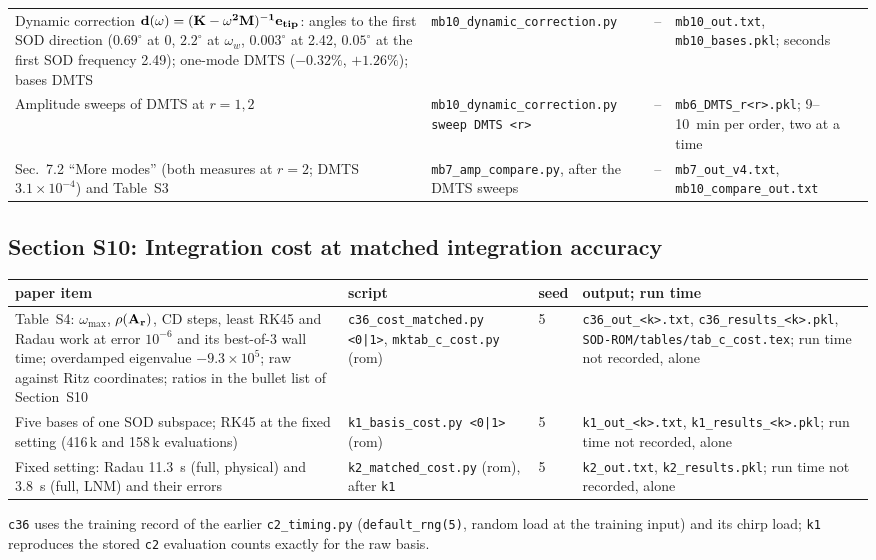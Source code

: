 \documentclass[10pt]{article}
\newcommand{\f}[1]{\texttt{#1}}
\begin{document}
\begin{longtable}{L{0.31\textwidth}L{0.25\textwidth}L{0.08\textwidth}L{0.25\textwidth}}
Dynamic correction $\bf d(\omega)=(K-\omega^2 M)^{-1}e_{tip}$: angles to the first SOD direction ($0.69^\circ$ at 0, $2.2^\circ$ at $\omega_w$, $0.003^\circ$ at 2.42, $0.05^\circ$ at the first SOD frequency 2.49); one-mode DMTS ($-0.32\%$, $+1.26\%$); bases DMTS & \f{mb10\_\allowbreak{}dynamic\_\allowbreak{}correction.py} & -- & \f{mb10\_\allowbreak{}out.txt}, \f{mb10\_\allowbreak{}bases.pkl}; seconds\\
Amplitude sweeps of DMTS at $r=1,2$ & \f{mb10\_\allowbreak{}dynamic\_\allowbreak{}correction.py sweep DMTS <r>} & -- & \f{mb6\_\allowbreak{}DMTS\_\allowbreak{}r<r>.pkl}; 9--10~min per order, two at a time\\
Sec.~7.2 ``More modes'' (both measures at $r=2$; DMTS $3.1\times10^{-4}$) and Table~S3 & \f{mb7\_\allowbreak{}amp\_\allowbreak{}compare.py}, after the DMTS sweeps & -- & \f{mb7\_\allowbreak{}out\_\allowbreak{}v4.txt}, \f{mb10\_\allowbreak{}compare\_\allowbreak{}out.txt}\\
\bottomrule
\end{longtable}

\subsection*{Section S10: Integration cost at matched integration accuracy}
\begin{longtable}{L{0.31\textwidth}L{0.25\textwidth}L{0.08\textwidth}L{0.25\textwidth}}
\toprule
paper item & script & seed & output; run time\\ \midrule
Table~S4: $\omega_{\max}$, $\rho(\bf A_r)$, CD steps, least RK45 and Radau work at error $10^{-6}$ and its best-of-3 wall time; overdamped eigenvalue $-9.3\times10^5$; raw against Ritz coordinates; ratios in the bullet list of Section~S10 & \f{c36\_\allowbreak{}cost\_\allowbreak{}matched.py <0|1>}, \f{mktab\_\allowbreak{}c\_\allowbreak{}cost.py} (rom) & 5 & \f{c36\_\allowbreak{}out\_\allowbreak{}<k>.txt}, \f{c36\_\allowbreak{}results\_\allowbreak{}<k>.pkl}, \f{SOD-ROM/\allowbreak{}tables/\allowbreak{}tab\_\allowbreak{}c\_\allowbreak{}cost.tex}; run time not recorded, alone\\
Five bases of one SOD subspace; RK45 at the fixed setting (416\,k and 158\,k evaluations) & \f{k1\_\allowbreak{}basis\_\allowbreak{}cost.py <0|1>} (rom) & 5 & \f{k1\_\allowbreak{}out\_\allowbreak{}<k>.txt}, \f{k1\_\allowbreak{}results\_\allowbreak{}<k>.pkl}; run time not recorded, alone\\
Fixed setting: Radau 11.3~s (full, physical) and 3.8~s (full, LNM) and their errors & \f{k2\_\allowbreak{}matched\_\allowbreak{}cost.py} (rom), after \f{k1} & 5 & \f{k2\_\allowbreak{}out.txt}, \f{k2\_\allowbreak{}results.pkl}; run time not recorded, alone\\
\bottomrule
\end{longtable}
\f{c36} uses the training record of the earlier \f{c2\_\allowbreak{}timing.py} (\f{default\_\allowbreak{}rng(5)}, random load at the training input) and its chirp load; \f{k1} reproduces the stored \f{c2} evaluation counts exactly for the raw basis.
\end{document}
